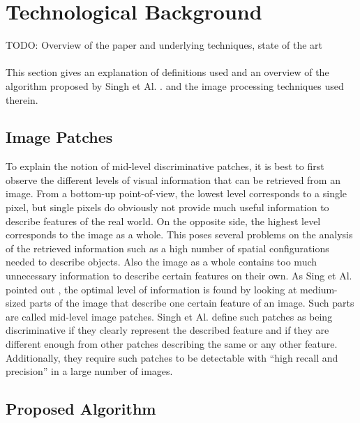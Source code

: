 
\section{Technological Background}\label{sec:StateArt}

TODO: Overview of the paper and underlying techniques, state of the art
\\
\\
This section gives an explanation of definitions used and an overview of the algorithm proposed by Singh et Al. \cite{Singh2012DiscPat}. and the image processing techniques used therein.

\subsection{Image Patches}

To explain the notion of mid-level discriminative patches, it is best to first observe the different levels of visual information that can be retrieved from an image. From a bottom-up point-of-view, the lowest level corresponds to a single pixel, but single pixels do obviously not provide much useful information to describe features of the real world. On the opposite side, the highest level corresponds to the image as a whole. This poses several problems on the analysis of the retrieved information such as a high number of spatial configurations needed to describe objects. Also the image as a whole contains too much unnecessary information to describe certain features on their own. As Sing et Al. pointed out \cite{Singh2012DiscPat}, the optimal level of information is found by looking at medium-sized parts of the image that describe one certain feature of an image. Such parts are called mid-level image patches. Singh et Al. \cite{Singh2012DiscPat} define such patches as being discriminative if they clearly represent the described feature and if they are different enough from other patches describing the same or any other feature. Additionally, they require such patches to be detectable with "`high recall and precision"' in a large number of images.

\subsection{Proposed Algorithm}

